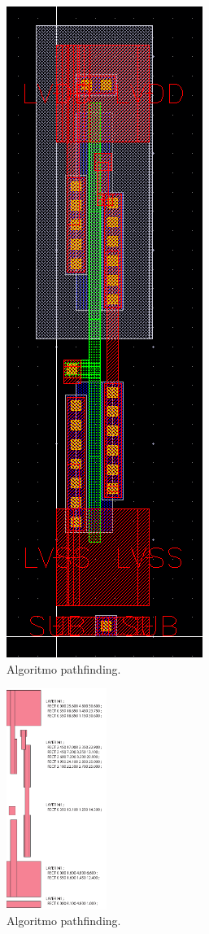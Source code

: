 \documentclass[reprint,amsmath,amssymb,aps]{revtex4-2}
\begin{document}
\begin{figure}[H]
	\centering
	\includegraphics[scale=0.65]{inv.png}
	\caption{Algoritmo pathfinding.}
	\label{inv}
\end{figure}

\begin{figure}[H]
	\centering
	\includegraphics[width=0.29\textwidth]{inv_m1.pdf}
	\caption{Algoritmo pathfinding.}
	\label{inv_m1}
\end{figure}
\end{document}

